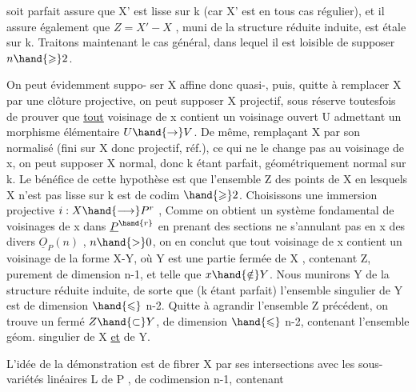 
 soit parfait assure que X' est lisse sur k (car X' est en tous cas
régulier), et il assure également que $Z = X' - X$ , muni de la structure
réduite induite, est étale sur k. Traitons maintenant le cas général,
dans lequel il est loisible de supposer $n \hand{\geqslant} 2$.

 On peut évidemment suppo-%
ser X  affine donc quasi-, puis, quitte à remplacer X
par une clôture projective, on peut supposer X projectif, sous réserve
toutesfois de prouver que \uline{tout} voisinage de x contient un voisinage
ouvert U admettant un morphisme élémentaire $U \hand{\to} V$. De même, remplaçant
X par son normalisé (fini sur X donc projectif, réf.), ce qui ne le
change pas au voisinage de x, on peut supposer X normal, donc k étant
parfait, géométriquement normal sur k.  Le
bénéfice de cette hypothèse est que l'ensemble Z des points de X en
lesquels X n'est pas lisse sur k est de codim $\hand{\geqslant} 2$. 
Choisissons une immersion projective $i : X \hand{\longrightarrow} P^r$ , 
 Comme on obtient un système
fondamental de voisinages de x dans $\underline{P}^{\hand{r}}$ en prenant des sections ne
s'annulant pas en x des divers $\underline{O}_P(n)$ , $n \hand{>} 0$, on en conclut que tout
voisinage de x contient un voisinage de la forme X-Y, où Y est une
partie fermée de X , contenant Z, purement de dimension n-1, et telle que
$x \hand{\notin} Y$. Nous munirons Y de la structure réduite induite, de sorte que
(k étant parfait) l'ensemble singulier de Y est de dimension $\hand{\leqslant}$ n-2. \margin{\unsure{$\nearrow$}}
Quitte à agrandir l'ensemble Z précédent, on trouve un fermé $Z \hand{\subset} Y$, de
dimension $\hand{\leqslant}$ n-2, contenant l'ensemble géom. singulier de X \uline{et} de Y.

L'idée de la démonstration est de fibrer X par ses intersections
avec les sous-variétés linéaires L de P , de codimension n-1, contenant

